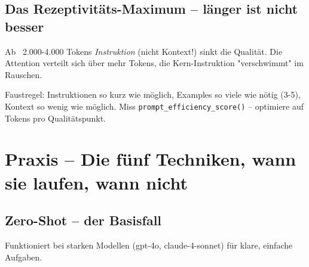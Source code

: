 
\subsection{Das Rezeptivitäts-Maximum -- länger ist nicht besser}

Ab ~2.000-4.000 Tokens \textit{Instruktion} (nicht Kontext!) sinkt die Qualität. Die Attention verteilt sich über mehr Tokens, die Kern-Instruktion "verschwimmt" im Rauschen.




\par\mbox{}\par
\begin{praxishinweisEnv}
Faustregel: Instruktionen so kurz wie möglich, Examples so viele wie nötig (3-5), Kontext so wenig wie möglich. Miss \texttt{prompt\_efficiency\_score()} -- optimiere auf Tokens pro Qualitätspunkt.
\end{praxishinweisEnv}

\section{Praxis -- Die fünf Techniken, wann sie laufen, wann nicht}

\subsection{Zero-Shot -- der Basisfall}

Funktioniert bei starken Modellen (gpt-4o, claude-4-sonnet) für klare, einfache Aufgaben.

